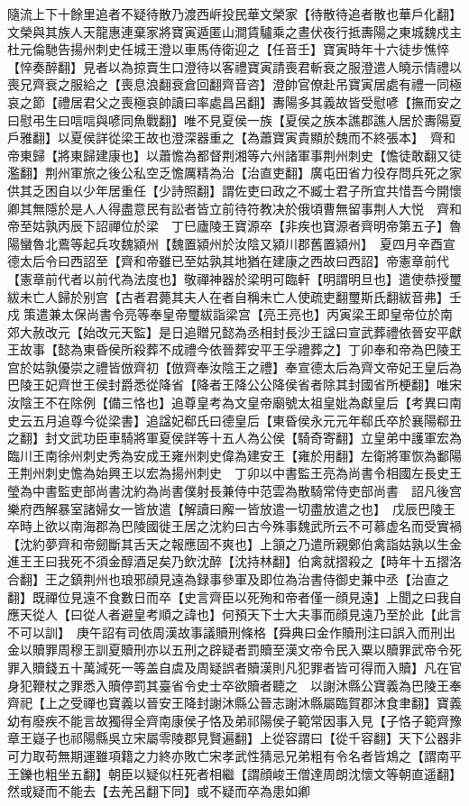 隨流上下十餘里追者不疑待散乃渡西㟁投民華文榮家【待散待追者散也華戶化翻】文榮與其族人天龍惠連棄家將寶寅遁匿山澗賃驢乘之晝伏夜行抵夀陽之東城魏戍主杜元倫馳告揚州刺史任城王澄以車馬侍衛迎之【任音壬】寶寅時年十六徒步憔悴【悴奏醉翻】見者以為掠賣生口澄待以客禮寶寅請喪君斬衰之服澄遣人曉示情禮以喪兄齊衰之服給之【喪息浪翻衰倉回翻齊音咨】澄帥官僚赴吊寶寅居處有禮一同極哀之節【禮居君父之喪極哀帥讀曰率處昌呂翻】夀陽多其義故皆受慰喭【撫而安之曰慰弔生曰唁唁與喭同魚戰翻】唯不見夏侯一族【夏侯之族本譙郡譙人居於夀陽夏戶雅翻】以夏侯詳從梁王故也澄深器重之【為蕭寶寅貴顯於魏而不終張本】　齊和帝東歸【將東歸建康也】以蕭憺為都督荆湘等六州諸軍事荆州刺史【憺徒敢翻又徒濫翻】荆州軍旅之後公私空乏憺厲精為治【治直吏翻】廣屯田省力役存問兵死之家供其乏困自以少年居重任【少詩照翻】謂佐吏曰政之不臧士君子所宜共惜吾今開懷卿其無隱於是人人得盡意民有訟者皆立前待符教决於俄頃曹無留事荆人大悦　齊和帝至姑孰丙辰下詔禪位於梁　丁巳廬陵王寶源卒【非疾也寶源者齊明帝第五子】魯陽蠻魯北鷰等起兵攻魏潁州【魏置潁州於汝陰又潁川郡舊置潁州】　夏四月辛酉宣德太后令曰西詔至【齊和帝雖已至姑孰其地猶在建康之西故曰西詔】帝憲章前代【憲章前代者以前代為法度也】敬禪神器於梁明可臨軒【明謂明旦也】遣使恭授璽紱未亡人歸於别宫【古者君薨其夫人在者自稱未亡人使疏吏翻璽斯氏翻紱音弗】壬戍策遣兼太保尚書令亮等奉皇帝璽紱詣梁宫【亮王亮也】丙寅梁王即皇帝位於南郊大赦改元【始改元天監】是日追贈兄懿為丞相封長沙王諡曰宣武葬禮依晉安平獻王故事【懿為東昏侯所殺葬不成禮今依晉葬安平王孚禮葬之】丁卯奉和帝為巴陵王宫於姑孰優崇之禮皆倣齊初【倣齊奉汝陰王之禮】奉宣德太后為齊文帝妃王皇后為巴陵王妃齊世王侯封爵悉從降省【降者王降公公降侯省者除其封國省所梗翻】唯宋汝陰王不在除例【備三恪也】追尊皇考為文皇帝廟號太祖皇妣為獻皇后【考異曰南史云五月追尊今從梁書】追諡妃郗氏曰德皇后【東昏侯永元元年郗氏卒於襄陽郗丑之翻】封文武功臣車騎將軍夏侯詳等十五人為公侯【騎奇寄翻】立皇弟中護軍宏為臨川王南徐州刺史秀為安成王雍州刺史偉為建安王【雍於用翻】左衛將軍恢為鄱陽王荆州刺史憺為始興王以宏為揚州刺史　丁卯以中書監王亮為尚書令相國左長史王瑩為中書監吏部尚書沈約為尚書僕射長兼侍中范雲為散騎常侍吏部尚書　詔凡後宫樂府西解暴室諸婦女一皆放遣【解讀曰廨一皆放遣一切盡放遣之也】　戊辰巴陵王卒時上欲以南海郡為巴陵國徙王居之沈約曰古今殊事魏武所云不可慕虚名而受實禍【沈約夢齊和帝劒斷其舌天之報應固不爽也】上頷之乃遣所親鄭伯禽詣姑孰以生金進王王曰我死不須金醇酒足矣乃飲沈醉【沈持林翻】伯禽就摺殺之【時年十五摺洛合翻】王之鎮荆州也琅邪顔見遠為録事參軍及即位為治書侍御史兼中丞【治直之翻】既禪位見遠不食數日而卒【史言齊臣以死殉和帝者僅一顔見遠】上聞之曰我自應天從人【曰從人者避皇考順之諱也】何預天下士大夫事而顔見遠乃至於此【此言不可以訓】　庚午詔有司依周漢故事議贖刑條格【舜典曰金作贖刑注曰誤入而刑出金以贖罪周穆王訓夏贖刑亦以五刑之辟疑者罰贖至漢文帝令民入粟以贖罪武帝令死罪入贖錢五十萬減死一等盖自虞及周疑誤者贖漢則凡犯罪者皆可得而入贖】凡在官身犯鞭杖之罪悉入贖停罰其臺省令史士卒欲贖者聽之　以謝沐縣公寶義為巴陵王奉齊祀【上之受禪也寶義以晉安王降封謝沐縣公晉志謝沐縣屬臨賀郡沐食聿翻】寶義幼有廢疾不能言故獨得全齊南康侯子恪及弟祁陽侯子範常因事入見【子恪子範齊豫章王嶷子也祁陽縣吳立宋屬零陵郡見賢遍翻】上從容謂曰【從千容翻】天下公器非可力取苟無期運雖項籍之力終亦敗亡宋孝武性猜忌兄弟粗有令名者皆鴆之【謂南平王鑠也粗坐五翻】朝臣以疑似枉死者相繼【謂顔峻王僧達周朗沈懷文等朝直遥翻】然或疑而不能去【去羌呂翻下同】或不疑而卒為患如卿
